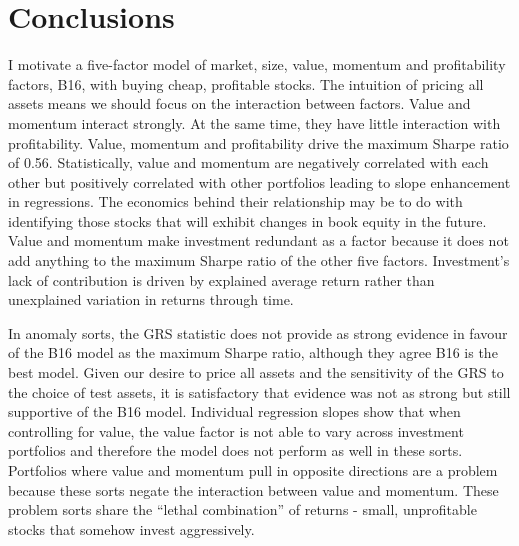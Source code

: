 
\section{Conclusions}

I motivate a five-factor model of market, size, value, momentum and profitability factors,
B16, with buying cheap, profitable stocks. The intuition of pricing all assets means we
should focus on the interaction between factors. Value and momentum interact strongly. At
the same time, they have little interaction with profitability. Value, momentum and
profitability drive the maximum Sharpe ratio of 0.56. Statistically, value and momentum
are negatively correlated with each other but positively correlated with other portfolios
leading to slope enhancement in regressions. The economics behind their relationship may
be to do with identifying those stocks that will exhibit changes in book equity in the
future. Value and momentum make investment redundant as a factor because it does not add
anything to the maximum Sharpe ratio of the other five factors. Investment's lack of
contribution is driven by explained average return rather than unexplained variation in
returns through time.

In anomaly sorts, the GRS statistic does not provide as strong evidence in favour of the
B16 model as the maximum Sharpe ratio, although they agree B16 is the best model. Given
our desire to price all assets and the sensitivity of the GRS to the choice of test
assets, it is satisfactory that evidence was not as strong but still supportive of the B16
model. Individual regression slopes show that when controlling for value, the value factor
is not able to vary across investment portfolios and therefore the model does not perform
as well in these sorts. Portfolios where value and momentum pull in opposite directions
are a problem because these sorts negate the interaction between value and momentum. These
problem sorts share the “lethal combination” of returns - small, unprofitable stocks that
somehow invest aggressively.

